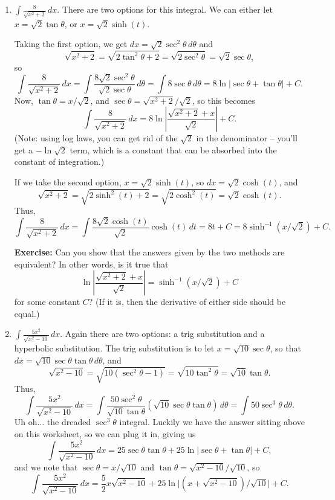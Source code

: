 \documentclass[12pt]{article}
\newcommand{\di}{\displaystyle}
\newcommand{\abs}[1]{\lvert #1\rvert}
\begin{document}
\begin{enumerate}
\pagebreak

 \item $\di \int \frac{8}{\sqrt{x^2+2}}\,dx$. There are two options for this integral. We can either let $x=\sqrt{2}\tan\theta$, or $x=\sqrt{2}\sinh(t)$.
 
 Taking the first option, we get $dx = \sqrt{2}\sec^2\theta\,d\theta$ and 
 \[
 \sqrt{x^2+2} = \sqrt{2\tan^2\theta+2} = \sqrt{2\sec^2\theta} = \sqrt{2}\sec\theta,
 \]
 so
 \[
 \int\frac{8}{\sqrt{x^2+2}}\,dx = \int \frac{8\sqrt{2}\sec^2\theta}{\sqrt{2}\sec\theta}\,d\theta = \int 8\sec\theta\,d\theta = 8\ln\abs{\sec\theta+\tan\theta}+C.
 \]
 Now, $\tan\theta = x/\sqrt{2}$, and $\sec\theta = \sqrt{x^2+2}/\sqrt{2}$, so this becomes
 \[
 \int\frac{8}{\sqrt{x^2+2}}\,dx = 8\ln\left\lvert \frac{\sqrt{x^2+2}+x}{\sqrt{2}}\right\rvert+C.
 \]
 (Note: using log laws, you can get rid of the $\sqrt{2}$ in the denominator --  you'll get a $-\ln\sqrt{2}$ term, which is a constant that can be absorbed into the constant of integration.)
 
 \bigskip
 
 If we take the second option, $x=\sqrt{2}\sinh(t)$, so $dx = \sqrt{2}\cosh(t)$, and 
 \[
 \sqrt{x^2+2} = \sqrt{2\sinh^2(t)+2} = \sqrt{2\cosh^2(t)} = \sqrt{2}\cosh(t).
 \]
 Thus,
 \[
 \int \frac{8}{\sqrt{x^2+2}}\,dx = \int \frac{8\sqrt{2}\cosh(t)}{\sqrt{2}}\cosh(t)\,dt = 8t+C = 8\sinh^{-1}(x/\sqrt{2})+C.
 \]
 
{\bf Exercise:} Can you show that the answers given by the two methods are equivalent? In other words, is it true that
\[
 \ln\left\lvert \frac{\sqrt{x^2+2}+x}{\sqrt{2}}\right\rvert=\sinh^{-1}(x/\sqrt{2})+C
\]
for some constant $C$? (If it is, then the derivative of either side should be equal.)

 \item $\di \int \frac{5x^2}{\sqrt{x^2-10}}\,dx$. Again there are two options: a trig substitution and a hyperbolic substitution. The trig substitution is to let $x=\sqrt{10}\sec\theta$, so that $dx = \sqrt{10}\sec\theta\tan\theta\,d\theta$, and
 \[
 \sqrt{x^2-10} = \sqrt{10(\sec^2\theta-1)} = \sqrt{10\tan^2\theta} = \sqrt{10}\tan\theta.
 \]
 Thus,
 \[
 \int \frac{5x^2}{\sqrt{x^2-10}}\,dx = \int\frac{50\sec^2\theta}{\sqrt{10}\tan\theta}(\sqrt{10}\sec\theta\tan\theta)\,d\theta = \int 50\sec^3\theta\,d\theta.
 \]
 Uh oh... the dreaded $\sec^3\theta$ integral. Luckily we have the answer sitting above on this worksheet, so we can plug it in, giving us
 \[
 \int \frac{5x^2}{\sqrt{x^2-10}}\,dx = 25\sec\theta\tan\theta+25\ln\abs{\sec\theta+\tan\theta}+C,
 \]
 and we note that $\sec\theta = x/\sqrt{10}$ and $\tan\theta = \sqrt{x^2-10}/\sqrt{10}$, so
 \[
 \int \frac{5x^2}{\sqrt{x^2-10}}\,dx = \frac{5}{2}x\sqrt{x^2-10}+25\ln\abs{(x+\sqrt{x^2-10})/\sqrt{10}}+C.
 \]
 

\end{enumerate}
\end{document}
